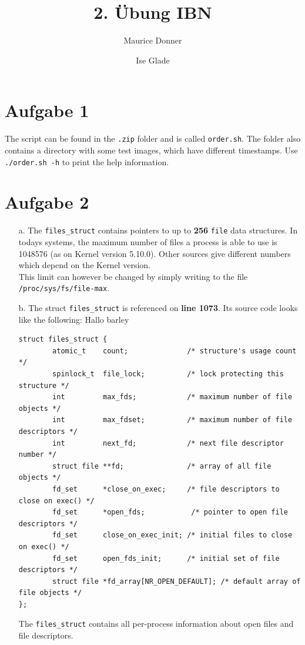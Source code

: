 \documentclass{article}
\title{\textsf{\color{blue!40!black}2. Übung IBN}}
\author{Maurice Donner \and Ise Glade}
\begin{document}
\maketitle

\section*{Aufgabe 1}
The script can be found in the \texttt{.zip} folder and is called \texttt{order.sh}.
The folder also contains a directory with some test images, which have different
timestamps. Use \texttt{./order.sh -h} to print the help information.

\section*{Aufgabe 2}
\begin{itemize}
    \item[a.] The \texttt{files\_struct} contains pointers to up to \textbf{256}
	\texttt{file} data structures. In todays systems, the maximum number of
	files a process is able to use is 1048576 (as on Kernel version 5.10.0).
	Other sources give different numbers which depend on the Kernel version.
	\\ This limit can however be changed by simply writing to the file\\
	\texttt{/proc/sys/fs/file-max}.
    \item[b.] The struct \texttt{files\_struct} is referenced on \textbf{line 1073}.
	Its source code looks like the following: Hallo barley
\begin{lstlisting}
struct files_struct {
        atomic_t    count;              /* structure's usage count */
        spinlock_t  file_lock;          /* lock protecting this structure */
        int         max_fds;            /* maximum number of file objects */
        int         max_fdset;          /* maximum number of file descriptors */
        int         next_fd;            /* next file descriptor number */
        struct file **fd;               /* array of all file objects */
        fd_set      *close_on_exec;     /* file descriptors to close on exec() */
        fd_set      *open_fds;           /* pointer to open file descriptors */
        fd_set      close_on_exec_init; /* initial files to close on exec() */
        fd_set      open_fds_init;      /* initial set of file descriptors */
        struct file *fd_array[NR_OPEN_DEFAULT]; /* default array of file objects */
};
\end{lstlisting}
The \texttt{files\_struct} contains all per-process information about open files
and file descriptors.
\end{itemize}
\end{document}
